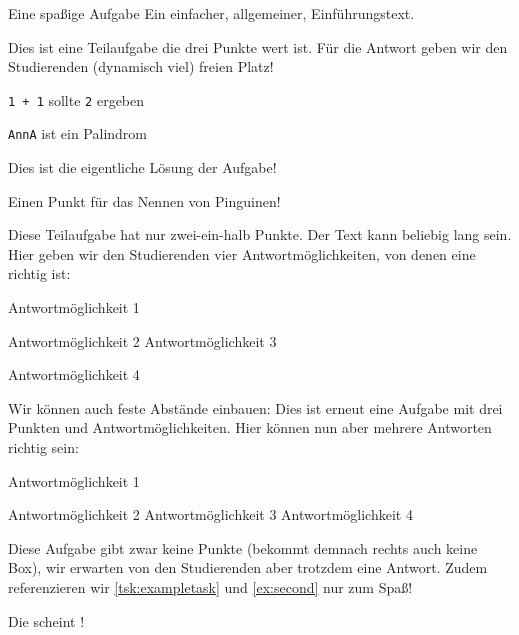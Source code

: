 \begin{task}[8.5]{Eine spaßige Aufgabe}
Ein einfacher, allgemeiner, Einführungstext.

\begin{subtasks}
    Dies ist eine Teilaufgabe die drei Punkte wert ist. Für die Antwort geben wir den Studierenden (dynamisch viel) freien Platz!
   \begin{examples}
      \item \texttt{1 + 1} sollte \texttt{2} ergeben
      \item \texttt{AnnA} ist ein Palindrom
   \end{examples}

   \VerticalSpace
\begin{solution}
   Dies ist die eigentliche Lösung der Aufgabe!
\end{solution}
\begin{correction}
   Einen Punkt für das Nennen von Pinguinen!
\end{correction}
    \label{tsk:exampletask}Diese Teilaufgabe hat nur zwei-ein-halb Punkte. Der Text kann beliebig lang sein. Hier geben wir den Studierenden vier Antwortmöglichkeiten, von denen eine richtig ist:
   \begin{radioboxes}
      \item    Antwortmöglichkeit 1
      \item    Antwortmöglichkeit 2
      \correct Antwortmöglichkeit 3
      \item    Antwortmöglichkeit 4
   \end{radioboxes}
   Wir können auch feste Abstände einbauen:
   \VerticalSpace[2cm]
    Dies ist erneut eine Aufgabe mit drei Punkten und Antwortmöglichkeiten. Hier können nun aber mehrere Antworten richtig sein:
   \begin{checkboxes}
      \correct Antwortmöglichkeit 1
      \item    Antwortmöglichkeit 2
      \correct Antwortmöglichkeit 3
      \correct Antwortmöglichkeit 4
   \end{checkboxes}
    Diese Aufgabe gibt zwar keine Punkte (bekommt demnach rechts auch keine Box), wir erwarten von den Studierenden aber trotzdem eine Antwort. Zudem referenzieren wir \autoref{tsk:exampletask} und \autoref{ex:second} nur zum Spaß!

   Die  scheint !
   \qquad\strut
\end{subtasks}
\end{task}